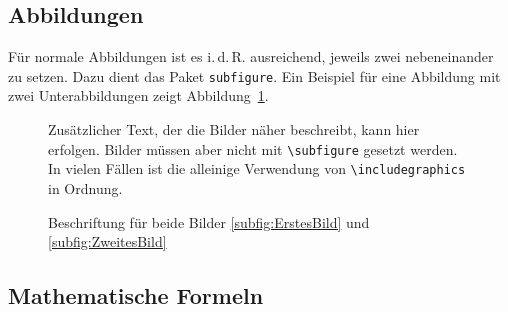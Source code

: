 \subsection{Abbildungen}
Für normale Abbildungen ist es i.\,d.\,R. ausreichend, jeweils zwei
nebeneinander zu setzen. Dazu dient das Paket \verb!subfigure!. Ein Beispiel für
eine Abbildung mit zwei Unterabbildungen zeigt Abbildung~\ref{fig:ZweiBilder}.
\begin{figure}[htbp]
\centerline{
\hfill
{}}
\caption{Beschriftung für beide Bilder \ref{subfig:ErstesBild} und
\ref{subfig:ZweitesBild}}\label{fig:ZweiBilder}
\begin{small}
Zusätzlicher Text, der die Bilder näher beschreibt, kann hier erfolgen. Bilder
müssen aber nicht mit \verb!\subfigure! gesetzt werden. In vielen Fällen ist die
alleinige Verwendung von \verb!\includegraphics! in Ordnung.
\end{small}
\end{figure}


\subsection{Mathematische Formeln}

